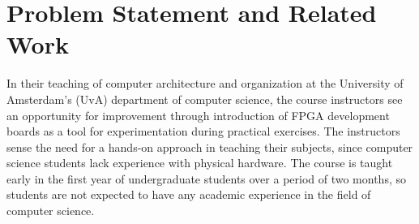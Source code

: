 \documentclass[openright]{template/uva-bachelor-thesis}
\begin{document}





\section{Problem Statement and Related Work}
In their teaching of computer architecture and organization at the University of Amsterdam's (UvA) department of computer science, the course instructors see an opportunity for improvement through introduction of FPGA development boards as a tool for experimentation during practical exercises. The instructors sense the need for a hands-on approach in teaching their subjects, since computer science students lack experience with physical hardware. The course is taught early in the first year of undergraduate students over a period of two months, so students are not expected to have any academic experience in the field of computer science. 
\end{document}
